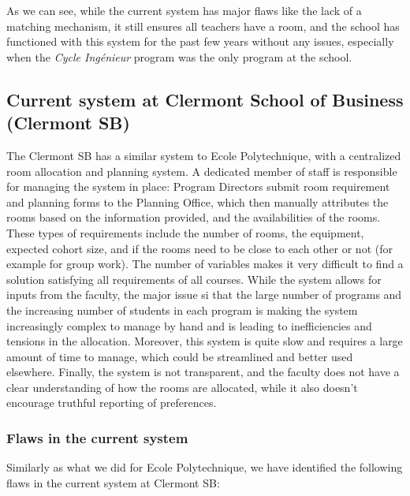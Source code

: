 \documentclass[a4paper, oneside]{article}
\theoremstyle{plain}
\begin{document}
\linebreak

\vspace{0.05cm}

As we can see, while the current system has major flaws like the lack of a matching mechanism,
it still ensures all teachers have a room, and the school has functioned with this system for the past few years without any issues,
especially when the \textit{Cycle Ingénieur} program was the only program at the school.

\subsection{Current system at Clermont School of Business (Clermont SB)}
The Clermont SB has a similar system to Ecole Polytechnique, with a centralized room allocation and planning system. A dedicated member of staff is responsible
for managing the system in place: Program Directors submit room requirement and planning forms to the Planning Office, which then manually attributes the rooms based on the information provided,
and the availabilities of the rooms. These types of requirements include the number of rooms, the equipment, expected cohort size, and if the rooms need to be close to each other or not (for example for group work).
The number of variables makes it very difficult to find a solution satisfying all requirements of all courses.
While the system allows for inputs from the faculty, the major issue si that the large number of programs and the increasing number of students in each program
is making the system increasingly complex to manage by hand and is leading to inefficiencies and tensions in the allocation. Moreover, this system is quite slow and requires
a large amount of time to manage, which could be streamlined and better used elsewhere. Finally, the system is not transparent,
and the faculty does not have a clear understanding of how the rooms are allocated, while it also doesn't encourage truthful reporting of preferences.

\subsubsection{Flaws in the current system}
Similarly as what we did for Ecole Polytechnique, we have identified the following flaws in the current system at Clermont SB:\\
\end{document}

